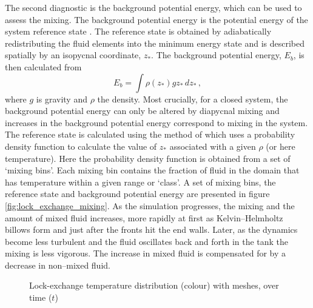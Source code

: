 The second diagnostic is the background potential energy, which can be used to assess the mixing. The background potential energy is the potential energy of the system reference state \citep{winters1995, winters1996}. The reference state is obtained by adiabatically redistributing the fluid elements into the minimum energy state and is described spatially by an isopycnal coordinate, $z_*$. The background potential energy, $E_b$, is then calculated from
\begin{equation}
E_b = \int \rho(z_*) g z_* \, dz_* \, ,
\end{equation}
where $g$ is gravity and $\rho$ the density. Most crucially, for a closed system, the background potential energy can only be altered by diapycnal mixing and increases in the background potential energy correspond to mixing in the system. The reference state is calculated using the method of \citet{tseng2001} which uses a probability density function to calculate the value of $z_*$ associated with a given $\rho$ (or here temperature). Here the probability density function is obtained from a set of `mixing bins'. Each mixing bin contains the fraction of fluid in the domain that has temperature within a given range or `class'. A set of mixing bins, the reference state and background potential energy are presented in figure \ref{fig:lock_exchange_mixing}. As the simulation progresses, the mixing and the amount of mixed fluid increases, more rapidly at first as Kelvin--Helmholtz billows form and just after the fronts hit the end walls. Later, as the dynamics become less turbulent and the fluid oscillates back and forth in the tank the mixing is less vigorous. The increase in mixed fluid is compensated for by a decrease in non--mixed fluid.


\begin{figure}[ht]
  \centering
  \caption{Lock-exchange temperature distribution (colour) with meshes, over time ($t$)}
  \label{fig:lock_exchange}
\end{figure}

